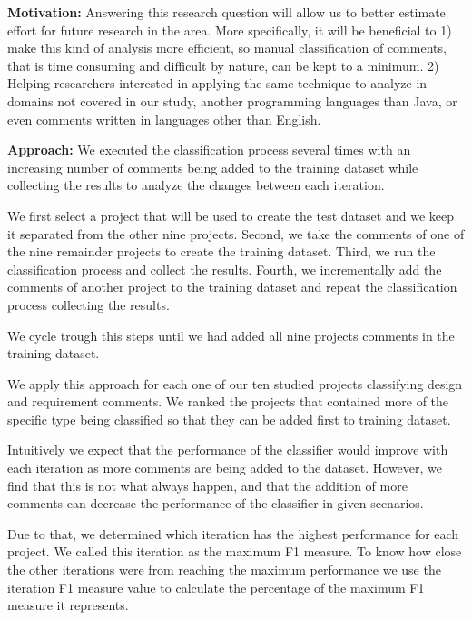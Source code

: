 \vspace{3mm}
\noindent\rqiii
\vspace{3mm}

\noindent \textbf{Motivation:} Answering this research question will allow us to better estimate effort for future research in the area. More specifically, it will be beneficial to 1) make this kind of analysis more efficient, so manual classification of comments, that is time consuming and difficult by nature, can be kept to a minimum. 2) Helping researchers interested in applying the same technique to analyze \SATD in domains not covered in our study, another programming languages than Java, or even comments written in languages other than English. 

\vspace{1mm}
\noindent \textbf{Approach:} We executed the classification process several times with an increasing number of comments being added to the training dataset while collecting the results to analyze the changes between each iteration. 

We first select a project that will be used to create the test dataset and we keep it separated from the other nine projects. Second, we take the comments of one of the nine remainder projects to create the training dataset. Third, we run the classification process and collect the results. Fourth, we incrementally add the comments of another project to the training dataset and repeat the classification process collecting the results. 

We cycle trough this steps until we had added all nine projects comments in the training dataset. 

We apply this approach for each one of our ten studied projects classifying design and requirement \SATD comments. We ranked the projects that contained more \SATD of the specific type being classified so that they can be added first to training dataset. 

Intuitively we expect that the performance of the classifier would improve with each iteration as more comments are being added to the dataset. However, we find that this is not what always happen, and that the addition of more comments can decrease the performance of the classifier in given scenarios.

Due to that, we determined which iteration has the highest performance for each project. We called this iteration as the maximum F1 measure. To know how close the other iterations were from reaching the maximum performance we use the iteration F1 measure value to calculate the percentage of the maximum F1 measure it represents.

